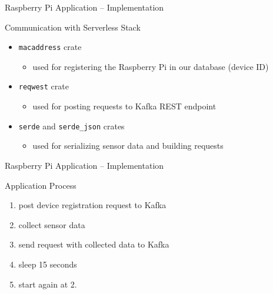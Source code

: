 \begin{frame}{Raspberry Pi Application -- Implementation}
  \begin{block}{Communication with Serverless Stack}
    \begin{itemize}
      \item \texttt{macaddress} crate
        \begin{itemize}
          \item used for registering the Raspberry Pi in our database (device ID)
        \end{itemize}
      \item \texttt{reqwest} crate
        \begin{itemize}
          \item used for posting requests to Kafka REST endpoint
        \end{itemize}
      \item \texttt{serde} and \texttt{serde\_json} crates
        \begin{itemize}
          \item used for serializing sensor data and building requests
        \end{itemize}
    \end{itemize}
  \end{block}
\end{frame}

\begin{frame}{Raspberry Pi Application -- Implementation}
  \begin{block}{Application Process}
    \begin{enumerate}
      \item post device registration request to Kafka
      \item collect sensor data
      \item send request with collected data to Kafka
      \item sleep 15 seconds
      \item start again at 2.
    \end{enumerate}
  \end{block}
\end{frame}
